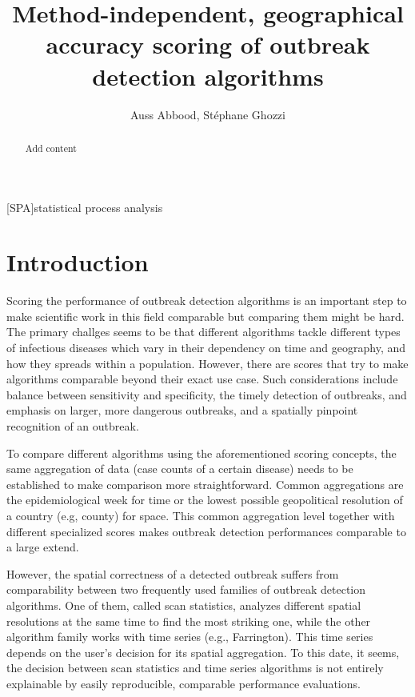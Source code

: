 \documentclass[a4paper, 12pt, one column]{article}
\title{Method-independent, geographical accuracy scoring of outbreak detection algorithms}
\author{Auss Abbood, Stéphane Ghozzi}
\begin{document}
\begin{acronym}
    [SPA]{statistical process analysis}
\end{acronym}

\maketitle

\begin{abstract}
Add content
\end{abstract}

\section{Introduction}

Scoring the performance of outbreak detection algorithms is an important step to make scientific work in this field comparable but comparing them might be hard. The primary challges seems to be that different algorithms tackle different types of infectious diseases which vary in their dependency on time and geography, and how they spreads within a population. However, there are scores that try to make algorithms comparable beyond their exact use case. Such considerations include balance between sensitivity and specificity, the timely detection of outbreaks, and emphasis on larger, more dangerous outbreaks, and a spatially pinpoint recognition of an outbreak. 

To compare different algorithms using the aforementioned scoring concepts, the same aggregation of data (case counts of a certain disease) needs to be established to make comparison more straightforward. Common aggregations are the epidemiological week for time or the lowest possible geopolitical resolution of a country (e.g, county) for space. This common aggregation level together with different specialized scores makes outbreak detection performances comparable to a large extend. 

However, the spatial correctness of a detected outbreak suffers from comparability between two frequently used families of outbreak detection algorithms. One of them, called scan statistics, analyzes different spatial resolutions at the same time to find the most striking one, while the other algorithm family works with time series (e.g., Farrington). This time series depends on the user's decision for its spatial aggregation. To this date, it seems, the decision between scan statistics and time series algorithms is not entirely explainable by easily reproducible, comparable performance evaluations. 
\end{document}

